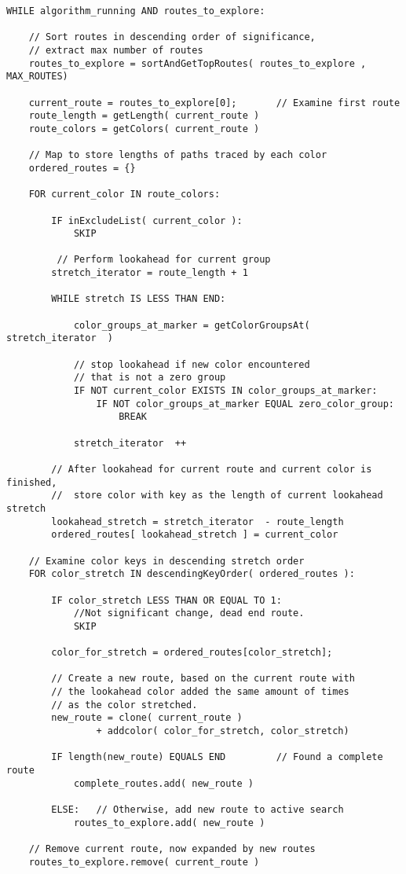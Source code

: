 \pagebreak
\begingroup
\begin{spacing}{0.9}
\begin{lstlisting}
WHILE algorithm_running AND routes_to_explore:

	// Sort routes in descending order of significance,
	// extract max number of routes
	routes_to_explore = sortAndGetTopRoutes( routes_to_explore , MAX_ROUTES)
		
	current_route = routes_to_explore[0];		// Examine first route
	route_length = getLength( current_route )
	route_colors = getColors( current_route )

	// Map to store lengths of paths traced by each color
	ordered_routes = {}  

	FOR current_color IN route_colors:
		
		IF inExcludeList( current_color ): 
			SKIP

		 // Perform lookahead for current group
		stretch_iterator = route_length + 1

		WHILE stretch IS LESS THAN END:

			color_groups_at_marker = getColorGroupsAt( stretch_iterator  )

			// stop lookahead if new color encountered
			// that is not a zero group
			IF NOT current_color EXISTS IN color_groups_at_marker:
				IF NOT color_groups_at_marker EQUAL zero_color_group:
					BREAK
			
			stretch_iterator  ++
	
		// After lookahead for current route and current color is finished,
		//  store color with key as the length of current lookahead stretch
		lookahead_stretch = stretch_iterator  - route_length
		ordered_routes[ lookahead_stretch ] = current_color

	// Examine color keys in descending stretch order
	FOR color_stretch IN descendingKeyOrder( ordered_routes ):
		
		IF color_stretch LESS THAN OR EQUAL TO 1:
			//Not significant change, dead end route.
			SKIP

		color_for_stretch = ordered_routes[color_stretch];

		// Create a new route, based on the current route with
		// the lookahead color added the same amount of times
		// as the color stretched.
		new_route = clone( current_route )
		        + addcolor( color_for_stretch, color_stretch)

		IF length(new_route) EQUALS END			// Found a complete route
			complete_routes.add( new_route )

		ELSE: 	// Otherwise, add new route to active search
			routes_to_explore.add( new_route )

	// Remove current route, now expanded by new routes
	routes_to_explore.remove( current_route )
\end{lstlisting}
\vspace{-10pt}
\label{code:astarbf}
\end{spacing}
\endgroup

